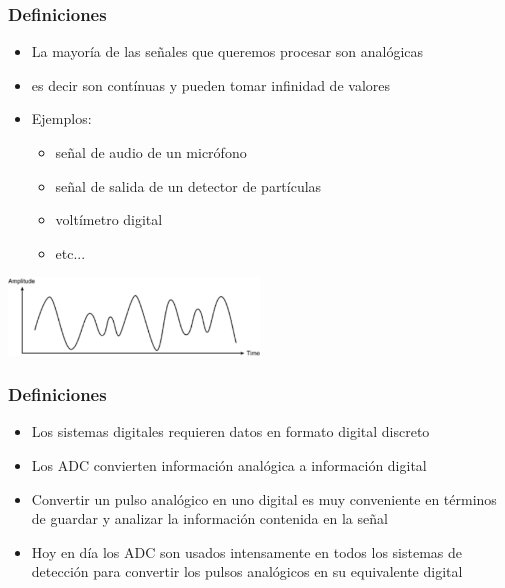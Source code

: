 \documentclass{beamer}
\begin{document}
\begin{frame}
	\frametitle{Definiciones}
		\begin{block}{}
    	\begin{itemize}
      	\item La mayoría de las señales que queremos procesar son analógicas
      	\item es decir son contínuas y pueden tomar infinidad de valores
      	\item Ejemplos:
    	\begin{itemize}
      	\item señal de audio de un micrófono
      	\item señal de salida de un detector de partículas
      	\item voltímetro digital
        \item etc...
    	\end{itemize}
    	\end{itemize}
		\end{block}
\begin{center}
    \includegraphics[width=0.5\textwidth]{d3/analog_signal}
\end{center}
\end{frame} 

\begin{frame}
	\frametitle{Definiciones}
{
		\begin{block}{}
    	\begin{itemize}
      	\item Los sistemas digitales requieren datos en formato digital discreto 
      	\item Los ADC convierten información analógica a información digital
      	\item Convertir un pulso analógico en uno digital es muy conveniente en
términos de guardar y analizar la información contenida en la señal  
      	\item Hoy en día los ADC son usados intensamente en todos los sistemas
de detección para convertir los pulsos analógicos en su equivalente digital 
    	\end{itemize}
		\end{block}
}
\begin{center}
\end{center}
\end{frame} 
\end{document}
